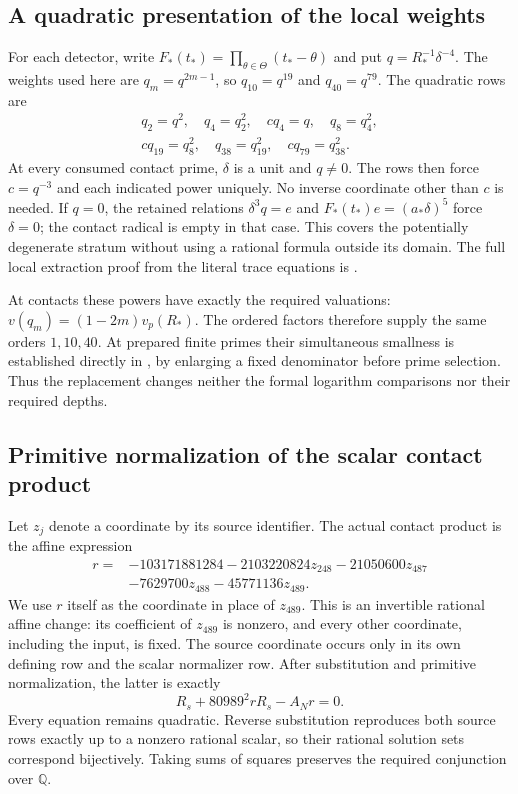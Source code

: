 \documentclass[11pt,a4paper]{article}
\theoremstyle{remark}\newtheorem{remark}[theorem]{Remark}
\newcommand{\Q}{\mathbb Q}\newcommand{\Z}{\mathbb Z}\newcommand{\HH}{\mathcal H}
\begin{document}
\subsection{A quadratic presentation of the local weights}
For each detector, write $F_*(t_*)=\prod_{\theta\in\Theta}(t_*-\theta)$
and put $q=R_*^{-1}\delta^{-4}$. The weights used here
are $q_m=q^{2m-1}$, so $q_{10}=q^{19}$ and $q_{40}=q^{79}$.
The quadratic rows are
\[
 \begin{gathered}
 q_2=q^2,\quad q_4=q_2^2,\quad c q_4=q,\quad q_8=q_4^2,\\
 c q_{19}=q_8^2,\quad q_{38}=q_{19}^2,\quad c q_{79}=q_{38}^2.
 \end{gathered}
\]
At every consumed contact prime, $\delta$ is a unit and $q\ne0$.
The rows then force $c=q^{-3}$ and each indicated power uniquely.
No inverse coordinate other than $c$ is needed. If $q=0$, the retained
relations $\delta^3q=e$ and $F_*(t_*)e=(a_*\delta)^5$ force
$\delta=0$; the contact radical is empty in that case.
This covers the potentially degenerate stratum without using a rational
formula outside its domain. The full local extraction proof from the
literal trace equations is \cite[Section 2]{Shared}.

At contacts these powers have exactly the required valuations:
$v(q_m)=(1-2m)v_p(R_*)$. The ordered factors therefore supply the same
orders $1,10,40$. At prepared finite primes their simultaneous smallness
is established directly in \cite[Section 3]{Shared}, by enlarging a fixed
denominator before prime selection. Thus the replacement changes neither
the formal logarithm comparisons nor their required depths.


\subsection{Primitive normalization of the scalar contact product}
Let $z_j$ denote a coordinate by its source identifier. The actual
contact product is the affine expression
\[
 \begin{aligned}
 r={}&-103171881284-2103220824z_{248}-21050600z_{487}\\
     &-7629700z_{488}-45771136z_{489}.
 \end{aligned}
\]
We use $r$ itself as the coordinate in place of $z_{489}$. This is an
invertible rational affine change: its coefficient of $z_{489}$ is
nonzero, and every other coordinate, including the input, is fixed.
The source coordinate occurs only in its own defining row and the
scalar normalizer row. After substitution and primitive normalization,
the latter is exactly
\[
                  R_s+80989^2rR_s-A_Nr=0.
\]
Every equation remains quadratic. Reverse substitution reproduces both
source rows exactly up to a nonzero rational scalar, so their rational
solution sets correspond bijectively. Taking sums of squares preserves
the required conjunction over $\Q$.
\end{document}
